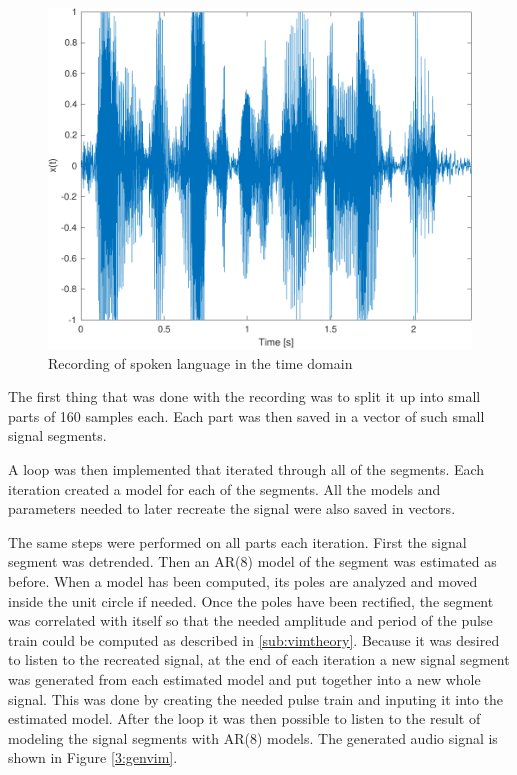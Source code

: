\documentclass{IEEEtran}
\begin{document}
\begin{figure}[h]
  \centering
  \captionsetup{justification=centering}

  \includegraphics[width=0.8\columnwidth]{pictures/vim_orig.pdf}
  \caption{Recording of spoken language in the time domain}
  \label{3:rawvim}

\end{figure}

The first thing that was done with the recording was to split it up into
small parts of 160 samples each. Each part was then saved in a vector
of such small signal segments.

A loop was then implemented that iterated through all of the segments.
Each iteration created a model for each of the segments. All the models
and parameters needed to later recreate the signal were also saved in
vectors.

The same steps were performed on all parts each iteration. First the
signal segment was detrended. Then an AR(8) model of the segment was
estimated as before. When a model has been computed, its poles are
analyzed and moved inside the unit circle if needed. Once the poles
have been rectified, the segment was correlated with itself so that
the needed amplitude and period of the pulse train could be computed
as described in \ref{sub:vimtheory}. Because it was desired to listen
to the recreated signal, at the end of each iteration a new signal
segment was generated from each estimated model and put together into
a new whole signal. This was done by creating the needed pulse train
and inputing it into the estimated model. After the loop it was then
possible to listen to the result of modeling the signal segments with
AR(8) models. The generated audio signal is shown in Figure
\ref{3:genvim}.
\end{document}
